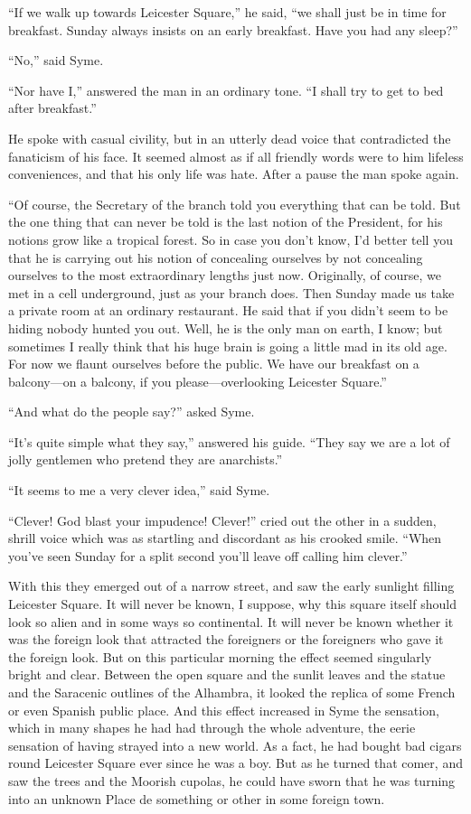 \documentclass{book}
\begin{document}
“If we walk up towards Leicester Square,” he said, “we shall just be in time for breakfast. Sunday always insists on an early breakfast. Have you had any sleep?”

“No,” said Syme.

“Nor have I,” answered the man in an ordinary tone. “I shall try to get to bed after breakfast.”

He spoke with casual civility, but in an utterly dead voice that contradicted the fanaticism of his face. It seemed almost as if all friendly words were to him lifeless conveniences, and that his only life was hate. After a pause the man spoke again.

“Of course, the Secretary of the branch told you everything that can be told. But the one thing that can never be told is the last notion of the President, for his notions grow like a tropical forest. So in case you don’t know, I’d better tell you that he is carrying out his notion of concealing ourselves by not concealing ourselves to the most extraordinary lengths just now. Originally, of course, we met in a cell underground, just as your branch does. Then Sunday made us take a private room at an ordinary restaurant. He said that if you didn’t seem to be hiding nobody hunted you out. Well, he is the only man on earth, I know; but sometimes I really think that his huge brain is going a little mad in its old age. For now we flaunt ourselves before the public. We have our breakfast on a balcony—on a balcony, if you please—overlooking Leicester Square.”

“And what do the people say?” asked Syme.

“It’s quite simple what they say,” answered his guide. “They say we are a lot of jolly gentlemen who pretend they are anarchists.”

“It seems to me a very clever idea,” said Syme.

“Clever! God blast your impudence! Clever!” cried out the other in a sudden, shrill voice which was as startling and discordant as his crooked smile. “When you’ve seen Sunday for a split second you’ll leave off calling him clever.”

With this they emerged out of a narrow street, and saw the early sunlight filling Leicester Square. It will never be known, I suppose, why this square itself should look so alien and in some ways so continental. It will never be known whether it was the foreign look that attracted the foreigners or the foreigners who gave it the foreign look. But on this particular morning the effect seemed singularly bright and clear. Between the open square and the sunlit leaves and the statue and the Saracenic outlines of the Alhambra, it looked the replica of some French or even Spanish public place. And this effect increased in Syme the sensation, which in many shapes he had had through the whole adventure, the eerie sensation of having strayed into a new world. As a fact, he had bought bad cigars round Leicester Square ever since he was a boy. But as he turned that comer, and saw the trees and the Moorish cupolas, he could have sworn that he was turning into an unknown Place de something or other in some foreign town.
\end{document}
